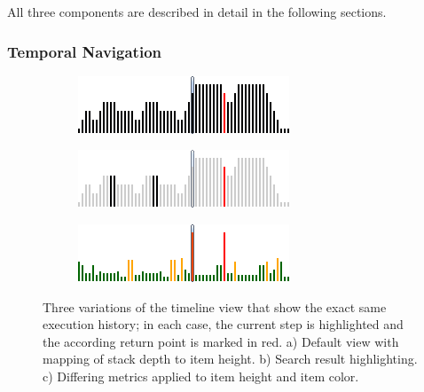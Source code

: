 All three components are described in detail in the following sections.

\subsubsection{Temporal Navigation}
\begin{figure}[tb]
	\centering
	
	\begin{subfigure}[b]{0.45\textwidth}
		\centering
        \includegraphics[width=\textwidth]{../images/04-ImplTimeline1}
        \caption[Default View]{}
		\label{fig:ApproachTimelineDefault}
	\end{subfigure}
	\quad
	\begin{subfigure}[b]{0.45\textwidth}
		\centering
		\includegraphics[width=\textwidth]{../images/04-ImplTimeline2}
		\caption[Search Result Highlighting]{}
		\label{fig:ApproachTimelineSearch}
	\end{subfigure}
	\quad
	\begin{subfigure}[b]{0.45\textwidth}
		\centering
		\includegraphics[width=\textwidth]{../images/04-ImplTimeline3}
		\caption[Differing Metrics Applied to Item Height and Color]{}
		\label{fig:ApproachTimelineMetrics}
	\end{subfigure}
	
	\caption[Variations of the Timeline View]{Three variations of the timeline view that show the exact same execution history; in each case, the current step is highlighted and the according return point is marked in red.
		a) Default view with mapping of stack depth to item height.
		b) Search result highlighting.
		c) Differing metrics applied to item height and item color.
	}
	\label{fig:ApproachTimeline}
\end{figure}

